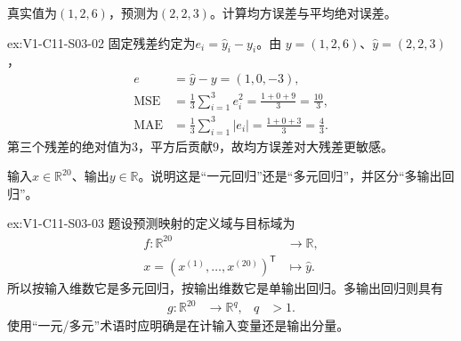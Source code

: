 \begin{SLChapterExercisePairSection}
\begin{exercise}\label{ex:V1-C11-S03-02}
真实值为$(1,2,6)$，预测为$(2,2,3)$。计算均方误差与平均绝对误差。
\end{exercise}
\label{sol:V1-C11-S03-02}
\begin{chapterexercisesolution}{ex:V1-C11-S03-02}
固定残差约定为$e_i=\widehat y_i-y_i$。由
$y=(1,2,6)$、$\widehat y=(2,2,3)$，
\[
\begin{aligned}
e&=\widehat y-y=(1,0,-3),\\
\mathrm{MSE}
  &=\frac13\sum_{i=1}^{3}e_i^2
    =\frac{1+0+9}{3}=\frac{10}{3},\\
\mathrm{MAE}
  &=\frac13\sum_{i=1}^{3}|e_i|
    =\frac{1+0+3}{3}=\frac43.
\end{aligned}
\]
第三个残差的绝对值为$3$，平方后贡献$9$，故均方误差对大残差更敏感。
\end{chapterexercisesolution}

\begin{exercise}\label{ex:V1-C11-S03-03}
输入$x\in\mathbb R^{20}$、输出$y\in\mathbb R$。说明这是“一元回归”还是“多元回归”，并区分“多输出回归”。
\end{exercise}
\label{sol:V1-C11-S03-03}
\begin{chapterexercisesolution}{ex:V1-C11-S03-03}
题设预测映射的定义域与目标域为
\[
\begin{aligned}
f:\mathbb R^{20}&\longrightarrow\mathbb R,\\
x=(x^{(1)},\ldots,x^{(20)})^{\mathsf T}
  &\longmapsto \widehat y.
\end{aligned}
\]
所以按输入维数它是多元回归，按输出维数它是单输出回归。多输出回归则具有
\[
\begin{aligned}
g:\mathbb R^{20}&\longrightarrow\mathbb R^q,
&q&>1.
\end{aligned}
\]
使用“一元/多元”术语时应明确是在计输入变量还是输出分量。
\end{chapterexercisesolution}


\end{SLChapterExercisePairSection}
